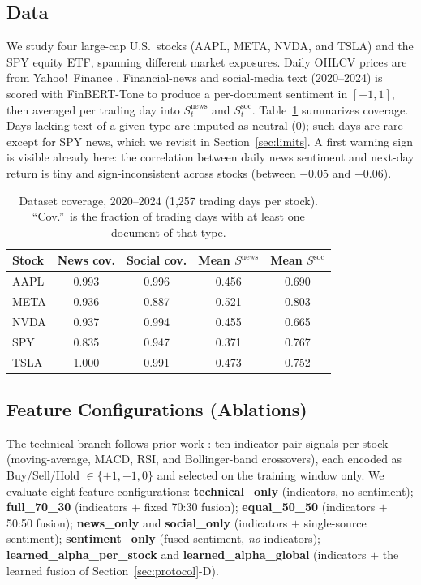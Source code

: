 \documentclass[conference]{IEEEtran}
\begin{document}
\subsection{Data}
We study four large-cap U.S.\ stocks (AAPL, META, NVDA, and TSLA) and the
SPY equity ETF, spanning different market exposures. Daily OHLCV prices are
from Yahoo!\ Finance \cite{yfinance2023}. Financial-news and social-media text
(2020--2024) is scored with FinBERT-Tone \cite{huang2022} to produce a
per-document sentiment in $[-1,1]$, then averaged per trading day into
$S^{\text{news}}_t$ and $S^{\text{soc}}_t$. Table~\ref{tab:data} summarizes
coverage. Days lacking text of a given type are imputed as neutral ($0$); such
days are rare except for SPY news, which we revisit in Section~\ref{sec:limits}.
A first warning sign is visible already here: the correlation between daily
news sentiment and next-day return is tiny and sign-inconsistent across stocks
(between $-0.05$ and $+0.06$).

\begin{table}[t]
\caption{Dataset coverage, 2020--2024 (1{,}257 trading days per stock).
``Cov.''\ is the fraction of trading days with at least one document of that
type.}
\label{tab:data}
\centering
\small
\begin{tabular}{lcccc}
\toprule
Stock & News cov. & Social cov. & Mean $S^{\text{news}}$ & Mean $S^{\text{soc}}$ \\
\midrule
AAPL & 0.993 & 0.996 & 0.456 & 0.690 \\
META & 0.936 & 0.887 & 0.521 & 0.803 \\
NVDA & 0.937 & 0.994 & 0.455 & 0.665 \\
SPY  & 0.835 & 0.947 & 0.371 & 0.767 \\
TSLA & 1.000 & 0.991 & 0.473 & 0.752 \\
\bottomrule
\end{tabular}
\end{table}

\subsection{Feature Configurations (Ablations)}
The technical branch follows prior work \cite{wang2023learning}: ten
indicator-pair signals per stock (moving-average, MACD, RSI, and Bollinger-band
crossovers), each encoded as Buy/Sell/Hold $\in\{+1,-1,0\}$ and selected on the
training window only. We evaluate eight feature configurations:
\textbf{technical\_only} (indicators, no sentiment);
\textbf{full\_70\_30} (indicators $+$ fixed 70:30 fusion);
\textbf{equal\_50\_50} (indicators $+$ 50:50 fusion);
\textbf{news\_only} and \textbf{social\_only} (indicators $+$ single-source
sentiment);
\textbf{sentiment\_only} (fused sentiment, \emph{no} indicators);
\textbf{learned\_alpha\_per\_stock} and \textbf{learned\_alpha\_global}
(indicators $+$ the learned fusion of Section~\ref{sec:protocol}-D).
\end{document}
